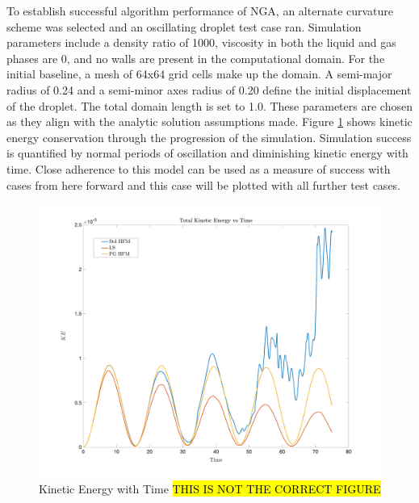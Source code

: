 To establish successful algorithm performance of NGA, an alternate curvature scheme was selected and an oscillating droplet test case ran. Simulation parameters include a density ratio of 1000, viscosity in both the liquid and gas phases are 0, and no walls are present in the computational domain. For the initial baseline, a mesh of 64x64 grid cells make up the domain. A semi-major radius of 0.24 and a semi-minor axes radius of 0.20 define the initial displacement of the droplet. The total domain length is set to 1.0. These parameters are chosen as they align with the analytic solution assumptions made. Figure \ref{fig:acesKE} shows kinetic energy conservation through the progression of the simulation. Simulation success is quantified by normal periods of oscillation and diminishing kinetic energy with time. Close adherence to this model can be used as a measure of success with cases from here forward and this case will be plotted with all further test cases. 
\begin{figure}[h]
	\centering
	\includegraphics[width=5.0in]{figs/KEvT}
	\caption{Kinetic Energy with Time \hl{THIS IS NOT THE CORRECT FIGURE}}
	\label{fig:acesKE}
\end{figure}

